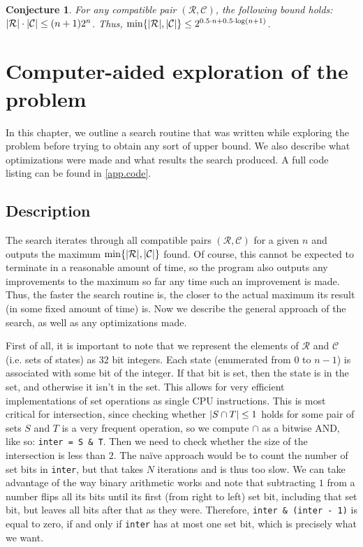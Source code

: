 \documentclass{report}
\DeclarePairedDelimiter{\set}{\{}{\}}
\DeclarePairedDelimiter{\abs}{\lvert}{\rvert}
\newtheorem{conjecture}[theorem]{Conjecture}
\theoremstyle{definition}
\begin{document}
\begin{conjecture} \label{cnj.better_bound}
For any compatible pair $(\mathcal{R}, \mathcal{C})$, the following bound holds:
$\abs{\mathcal{R}} \cdot \abs{\mathcal{C}} \leq (n + 1) 2^n$.
Thus, $\min\set{\abs{\mathcal{R}}, \abs{\mathcal{C}}} \leq
2^{0.5 \cdot n + 0.5 \cdot \log (n + 1)}$.
\end{conjecture}

\chapter{Computer-aided exploration of the problem}
\label{chp.computer_exploration}

In this chapter, we outline a search routine that was written while exploring the
problem before trying to obtain any sort of upper bound. We also describe what
optimizations were made and what results the search produced. A full code listing
can be found in \cref{app.code}.

\section{Description}

The search iterates through all compatible pairs $(\mathcal{R}, \mathcal{C})$ for a
given $n$ and outputs the maximum $\min\set{\abs{\mathcal{R}}, \abs{\mathcal{C}}}$
found. Of course, this cannot be expected to terminate in a reasonable amount of
time, so the program also outputs any improvements to the maximum so far any time
such an improvement is made. Thus, the faster the search routine is, the closer
to the actual maximum its result (in some fixed amount of time) is. Now we describe
the general approach of the search, as well as any optimizations made.

First of all, it is important to note that we represent the elements of $\mathcal{R}$
and $\mathcal{C}$ (i.e. sets of states) as 32 bit integers. Each state (enumerated
from $0$ to $n - 1$) is associated with some bit of the integer. If that bit is set,
then the state is in the set, and otherwise it isn't in the set. This allows for
very efficient implementations of set operations as single CPU instructions.
This is most critical for intersection, since checking whether
$\abs{S \cap T} \leq 1$ holds for some pair of sets $S$ and $T$ is a very frequent
operation, so we compute $\cap$ as a bitwise AND, like so: \verb|inter = S & T|.
Then we need to check whether the size of the intersection is less than $2$. The
na\"ive approach would be to count the number of set bits in \verb|inter|, but that
takes $N$ iterations and is thus too slow. We can take advantage of the way binary
arithmetic works and note that subtracting $1$ from a number flips all its bits
until its first (from right to left) set bit, including that set bit, but leaves
all bits after that as they were. Therefore, \verb|inter & (inter - 1)| is equal to
zero, if and only if \verb|inter| has at most one set bit, which is precisely what we
want.
\end{document}

